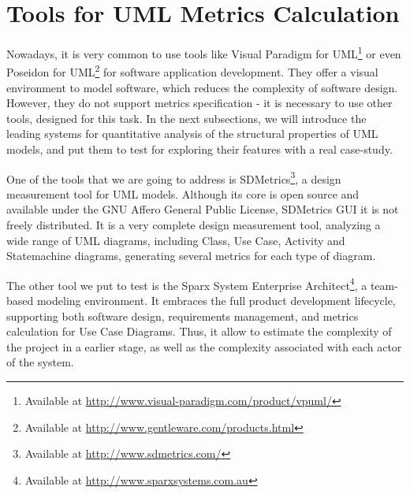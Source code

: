 \section{Tools for UML Metrics Calculation} \label{tools}

Nowadays, it is very common to use tools like \textsf{Visual Paradigm for UML\footnote{Available at \url{http://www.visual-paradigm.com/product/vpuml/}}} or even \textsf{Poseidon for UML}\footnote{Available at \url{http://www.gentleware.com/products.html}} for software application development.
They offer a visual environment to model software, which reduces the complexity of software design.
However, they do not support metrics specification - it is necessary to use other tools, designed for this task.
In the next subsections, we will introduce the leading systems for quantitative analysis of the structural properties of UML models, and put them to test for exploring their features with a real case-study.

One of the tools that we are going to address is SDMetrics\footnote{Available at \url{http://www.sdmetrics.com/}}, a design measurement tool for UML models.
Although its core is open source and available under the GNU Affero General Public License, SDMetrics GUI it is not freely distributed. 
It is a very complete design measurement tool, analyzing a wide range of UML diagrams, including Class, Use Case, Activity and Statemachine diagrams, generating several metrics for each type of diagram.

The other tool we put to test is the \textsf{Sparx System Enterprise Architect}{\footnote{Available at \url{http://www.sparxsystems.com.au}}}, a team-based modeling environment. 
It embraces the full product development lifecycle, supporting both software design, requirements management, and metrics calculation for Use Case Diagrams.
Thus, it allow to estimate the complexity of the project in a earlier stage, as well as the complexity associated with each actor of the system.
